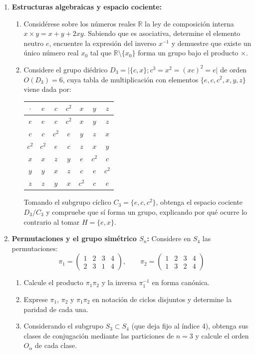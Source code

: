 \documentclass[11pt, a4paper]{article}
\begin{document}
\begin{enumerate}[label=\textbf{\arabic*.}]
    \item \textbf{Estructuras algebraicas y espacio cociente:}
    \begin{enumerate}[label=\alph*)]
        \item Considérese sobre los números reales $\mathbb{R}$ la ley de composición interna $x \times y = x + y + 2xy$. Sabiendo que es asociativa, determine el elemento neutro $e$, encuentre la expresión del inverso $x^{-1}$ y demuestre que existe un único número real $x_0$ tal que $\mathbb{R} \setminus \{x_0\}$ forma un grupo bajo el producto $\times$.
        \item Considere el grupo diédrico $D_3 = \big| \{c, x\} ; c^3 = x^2 = (xc)^2 = e \big|$ de orden $O(D_3) = 6$, cuya tabla de multiplicación con elementos $\{e, c, c^2, x, y, z\}$ viene dada por:
        \begin{center}
        \begin{tabular}{c|cccccc}
        $\cdot$ & $e$ & $c$ & $c^2$ & $x$ & $y$ & $z$ \\
        \hline
        $e$ & $e$ & $c$ & $c^2$ & $x$ & $y$ & $z$ \\
        $c$ & $c$ & $c^2$ & $e$ & $y$ & $z$ & $x$ \\
        $c^2$ & $c^2$ & $e$ & $c$ & $z$ & $x$ & $y$ \\
        $x$ & $x$ & $z$ & $y$ & $e$ & $c^2$ & $c$ \\
        $y$ & $y$ & $x$ & $z$ & $c$ & $e$ & $c^2$ \\
        $z$ & $z$ & $y$ & $x$ & $c^2$ & $c$ & $e$
        \end{tabular}
        \end{center}
        Tomando el subgrupo cíclico $C_3 = \{e, c, c^2\}$, obtenga el espacio cociente $D_3/C_3$ y compruebe que sí forma un grupo, explicando por qué ocurre lo contrario al tomar $H = \{e, x\}$.
    \end{enumerate}

    \item \textbf{Permutaciones y el grupo simétrico $S_n$:}
    Considere en $S_4$ las permutaciones:
    \[
    \pi_1 = \begin{pmatrix} 1 & 2 & 3 & 4 \\ 2 & 3 & 1 & 4 \end{pmatrix}, \qquad \pi_2 = \begin{pmatrix} 1 & 2 & 3 & 4 \\ 1 & 3 & 2 & 4 \end{pmatrix}
    \]
    \begin{enumerate}[label=\alph*)]
        \item Calcule el producto $\pi_1 \pi_2$ y la inversa $\pi_1^{-1}$ en forma canónica.
        \item Exprese $\pi_1$, $\pi_2$ y $\pi_1 \pi_2$ en notación de ciclos disjuntos y determine la paridad de cada una.
        \item Considerando el subgrupo $S_3 \subset S_4$ (que deja fijo al índice $4$), obtenga sus clases de conjugación mediante las particiones de $n = 3$ y calcule el orden $O_\alpha$ de cada clase.
    \end{enumerate}


\end{enumerate}
\end{document}
